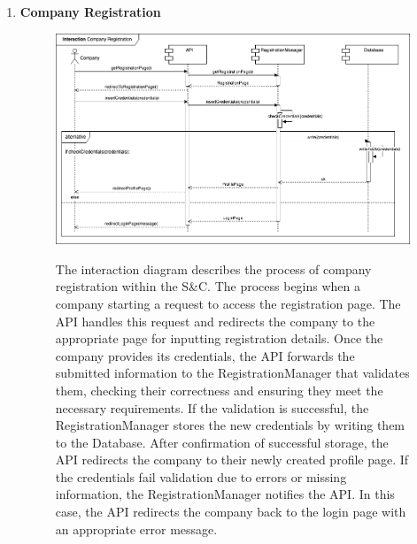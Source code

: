 \begin{enumerate}
    \newpage
    \item \textbf{Company Registration}
    \begin{figure}[h!]
            \centering  \includegraphics[width=1\textwidth]{DD/Images/Interactions/INT08_CompanyRegistration.drawio.png}
            \label{fig:ComponentViewDiagram}
            \caption*{The interaction diagram describes the process of company registration within the S\&C. The process begins when a company starting a request to access the registration page. The API handles this request and redirects the company to the appropriate page for inputting registration details. Once the company provides its credentials, the API forwards the submitted information to the RegistrationManager that validates them, checking their correctness and ensuring they meet the necessary requirements. If the validation is successful, the RegistrationManager stores the new credentials by writing them to the Database. After confirmation of successful storage, the API redirects the company to their newly created profile page. If the credentials fail validation due to errors or missing information, the RegistrationManager notifies the API. In this case, the API redirects the company back to the login page with an appropriate error message.
            }
    \end{figure}


\end{enumerate}
